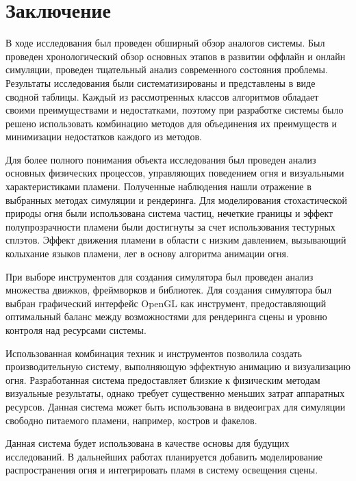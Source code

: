 \part*{Заключение}

В ходе исследования был проведен обширный обзор аналогов системы. Был проведен
хронологический обзор основных этапов в развитии оффлайн и онлайн симуляции,
проведен тщательный анализ современного состояния проблемы. Результаты
исследования были систематизированы и представлены в виде сводной таблицы.
Каждый из рассмотренных классов алгоритмов обладает своими преимуществами и недостатками,
поэтому при разработке системы было решено использовать комбинацию методов для
объединения их преимуществ и минимизации недостатков каждого из методов.

Для более полного понимания объекта исследования был проведен анализ основных
физических процессов, управляющих поведением огня и визуальными характеристиками
пламени. Полученные наблюдения нашли отражение в выбранных методах симуляции и
рендеринга. Для моделирования стохастической природы огня были использована
система частиц, нечеткие границы и эффект полупрозрачности пламени были
достигнуты за счет использования тестурных сплэтов. Эффект движения пламени в
области с низким давлением, вызывающий колыхание языков пламени, лег в основу
алгоритма анимации огня.

При выборе инструментов для создания симулятора был проведен анализ множества
движков, фреймворков и библиотек. Для создания симулятора был выбран графический
интерфейс OpenGL как инструмент, предоставляющий оптимальный баланс между
возможностями для рендеринга сцены и уровню контроля над ресурсами системы.

Использованная комбинация техник и инструментов позволила создать
производительную систему, выполняющую эффектную анимацию и визуализацию огня.
Разработанная система предоставляет близкие к физическим методам визуальные
результаты, однако требует существенно меньших затрат аппаратных ресурсов.
Данная система может быть использована в видеоиграх для симуляции свободно
питаемого пламени, например, костров и факелов.

Данная система будет использована в качестве основы для будущих исследований. В
дальнейших работах планируется добавить моделирование распространения огня и
интегрировать пламя в систему освещения сцены.
